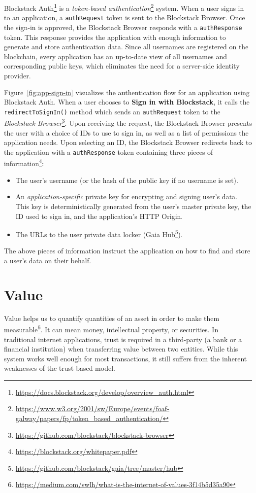 		Blockstack Auth\footnote{\url{https://docs.blockstack.org/develop/overview_auth.html}} is a \textit{token-based authentication}\footnote{\url{https://www.w3.org/2001/sw/Europe/events/foaf-galway/papers/fp/token_based_authentication/}} system. When a user signs in to an application, a \texttt{authRequest} token is sent to the Blockstack Browser. Once the sign-in is approved, the Blockstack Browser responds with a \texttt{authResponse} token. This response provides the application with enough information to generate and store authentication data. Since all usernames are registered on the blockchain, every application has an up-to-date view of all usernames and corresponding public keys, which eliminates the need for a server-side identity provider.
		
		Figure~\ref{fig:app-sign-in} visualizes the authentication flow for an application using Blockstack Auth. When a user chooses to \textbf{Sign in with Blockstack}, it calls the \texttt{redirectToSignIn()} method which sends an \texttt{authRequest} token to the \textit{Blockstack Browser}\footnote{\url{https://github.com/blockstack/blockstack-browser}}. Upon receiving the request, the Blockstack Browser presents the user with a choice of IDs to use to sign in, as well as a list of permissions the application needs. Upon selecting an ID, the Blockstack Browser redirects back to the application with a \texttt{authResponse} token containing three pieces of information\footnote{\url{https://blockstack.org/whitepaper.pdf}}:
		\begin{itemize}
			\item The user's username (or the hash of the public key if no username is set).
			\item An \textit{application-specific} private key for encrypting and signing user's data. This key is deterministically generated from the user's master private key, the ID used to sign in, and the application's HTTP Origin.
			\item The URLs to the user private data locker (Gaia Hub\footnote{\url{https://github.com/blockstack/gaia/tree/master/hub}}).
		\end{itemize}
		
		The above pieces of information instruct the application on how to find and store a user's data on their behalf.
	
\section{Value}
	Value helps us to quantify quantities of an asset in order to make them measurable\footnote{\url{https://medium.com/swlh/what-is-the-internet-of-values-3f14b5d35a90}}. It can mean money, intellectual property, or securities. In traditional internet applications, trust is required in a third-party (a bank or a financial institution) when transferring value between two entities. While this system works well enough for most transactions, it still suffers from the inherent weaknesses of the trust-based model\cite{nakamoto2008bitcoin}.
	
